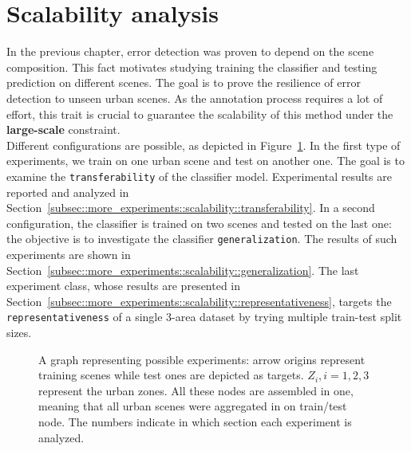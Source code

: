 \minitoc

\vfill

\clearpage

\section{Scalability analysis}
    \label{sec::more_experiments::scalability}
    In the previous chapter, error detection was proven to depend on the scene composition.
    This fact motivates studying training the classifier and testing prediction on different scenes.
    The goal is to prove the resilience of error detection to unseen urban scenes.
    As the annotation process requires a lot of effort, this trait is crucial to guarantee the scalability of this method under the \textbf{large-scale} constraint.\\

    Different configurations are possible, as depicted in Figure~\ref{fig::scalability_study}.
    In the first type of experiments, we train on one urban scene and test on another one.
    The goal is to examine the \texttt{transferability} of the classifier model.
    Experimental results are reported and analyzed in Section~\ref{subsec::more_experiments::scalability::transferability}.
    In a second configuration, the classifier is trained on two scenes and tested on the last one: the objective is to investigate the classifier \texttt{generalization}.
    The results of such experiments are shown in Section~\ref{subsec::more_experiments::scalability::generalization}.
    The last experiment class, whose results are presented in Section~\ref{subsec::more_experiments::scalability::representativeness}, targets the \texttt{representativeness} of a single 3-area dataset by trying multiple train-test split sizes.\\

    \begin{figure}[htbp]
        \ffigbox[\FBwidth]{
            
        }
        {
            \caption[
                A graph representing possible experiments: arrow origins represent training scenes while test ones are depicted as targets.
            ]{
                \label{fig::scalability_study}
                A graph representing possible experiments: arrow origins represent training scenes while test ones are depicted as targets.
                \(Z_i, i=1,2,3\) represent the urban zones.
                All these nodes are assembled in one, meaning that all urban scenes were aggregated in on train/test node.
                The numbers indicate in which section each experiment is analyzed.
            }
        }
    \end{figure}


